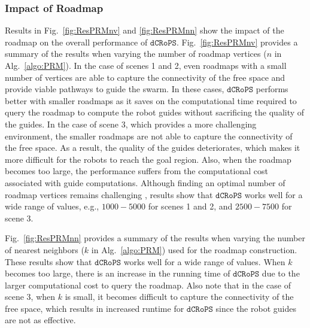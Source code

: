 \documentclass[letterpaper, 10pt, conference]{ieeeconf}
\newcommand{\Acronym}[1]{\ensuremath{{{\texttt{#1}}}}}
\newcommand{\Name}{\Acronym{dCRoPS}}
\begin{document}
\subsubsection{Impact of Roadmap}

Results in Fig.~\ref{fig:ResPRMnv} and \ref{fig:ResPRMnn} show the
impact of the roadmap on the overall performance of $\Name$.
Fig.~\ref{fig:ResPRMnv} provides a summary of the results when varying
the number of roadmap vertices ($n$ in Alg.~\ref{algo:PRM}). In the
case of scenes 1 and 2, even roadmaps with a small number of vertices
are able to capture the connectivity of the free space and provide
viable pathways to guide the swarm. In these cases, $\Name$ performs
better with smaller roadmaps as it saves on the computational time
required to query the roadmap to compute the robot guides without
sacrificing the quality of the guides. In the case of scene 3, which
provides a more challenging environment, the smaller roadmaps are not
able to capture the connectivity of the free space. As a result, the
quality of the guides deteriorates, which makes it more difficult for
the robots to reach the goal region.  Also, when the roadmap becomes
too large, the performance suffers from the computational cost
associated with guide computations. Although finding an optimal number
of roadmap vertices remains challenging
\cite{book:MP,IncrementalPRM,RRTStar}, results show that
$\Name$ works well for a wide range of values, e.g., $1000-5000$ for
scenes 1 and 2, and $2500-7500$ for scene 3. 


Fig.~\ref{fig:ResPRMnn} provides a summary of the results when varying
the number of nearest neighbors ($k$ in Alg.~\ref{algo:PRM}) used for
the roadmap construction. These results show that $\Name$ works well
for a wide range of values. When $k$ becomes too large, there is an
increase in the running time of $\Name$ due to the larger
computational cost to query the roadmap. Also note that in the case of
scene 3, when $k$ is small, it becomes difficult to capture the
connectivity of the free space, which results in increased runtime for $\Name$
since the robot guides are not as effective.
\end{document}
